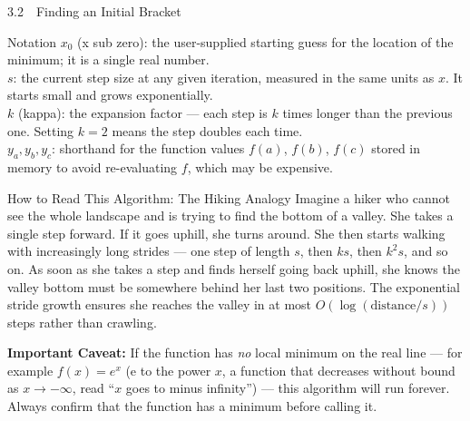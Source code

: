 \documentclass[aspectratio=169,10pt]{beamer}
\begin{document}
\begin{frame}[allowframebreaks]{3.2\ \ Finding an Initial Bracket}
  \begin{block}{Notation}
    $x_0$ (x sub zero): the user-supplied starting guess for the location
    of the minimum; it is a single real number.\\
    $s$: the current step size at any given iteration, measured in the same
    units as $x$.  It starts small and grows exponentially.\\
    $k$ (kappa): the expansion factor --- each step is $k$ times longer than
    the previous one.  Setting $k = 2$ means the step doubles each time.\\
    $y_a, y_b, y_c$: shorthand for the function values $f(a)$, $f(b)$, $f(c)$
    stored in memory to avoid re-evaluating $f$, which may be expensive.
  \end{block}

  \begin{alertblock}{How to Read This Algorithm: The Hiking Analogy}
    Imagine a hiker who cannot see the whole landscape and is trying to find
    the bottom of a valley.  She takes a single step forward.  If it goes
    uphill, she turns around.  She then starts walking with increasingly
    long strides --- one step of length $s$, then $ks$, then $k^2 s$, and
    so on.  As soon as she takes a step and finds herself going back uphill,
    she knows the valley bottom must be somewhere behind her last two
    positions.  The exponential stride growth ensures she reaches the valley
    in at most $O(\log(\text{distance}/s))$ steps rather than crawling.
  \end{alertblock}

  \textbf{Important Caveat:} If the function has \emph{no} local minimum on
  the real line --- for example $f(x) = e^x$ (e to the power $x$, a function
  that decreases without bound as $x \to -\infty$, read ``$x$ goes to minus
  infinity'') --- this algorithm will run forever.  Always confirm that the
  function has a minimum before calling it.

\end{frame}
\end{document}

